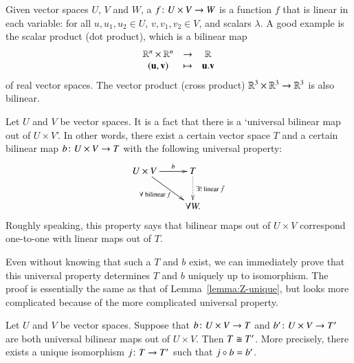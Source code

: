 \begin{iexample} 
\label{eg:univ-tensor}
Given vector%
%
%
spaces $U$, $V$ and $W$, a  $f\from U \times V \to W$ is a function $f$ that is linear in each
variable:
% 
% 
for all $u, u_1, u_2 \in U$, $v, v_1, v_2 \in V$, and scalars $\lambda$.  A
good example is the scalar product (dot product), which is a bilinear map
\[
\begin{array}{ccc}
\mathbb{R}^n \times \mathbb{R}^n        &\to            &\mathbb{R}                 \\
(\mathbf{u}, \mathbf{v})        &\mapsto        &\mathbf{u}.\mathbf{v}
\end{array}
\]
of real vector spaces.  The vector product (cross product) $\mathbb{R}^3 \times
\mathbb{R}^3 \to \mathbb{R}^3$ is also bilinear.  

Let $U$ and $V$ be vector spaces.  It is a fact that there is a `universal
bilinear map out of $U \times V$'.  In other words, there exist a certain
vector space $T$%
%
%
and a certain bilinear map $b\from U \times V \to T$ with the following
universal property:
% 
\begin{equation}        
\label{eq:univ-tensor} 
\begin{array}{c}
\xymatrix{
U \times V \ar[r]^-b \ar[dr]_{\forall \text{ bilinear } f} &
T \ar@{.>}[d]^{\exists! \text{ linear } \bar{f}}     \\
&
\forall W.
}
\end{array}
\end{equation}
% 
Roughly speaking, this property says that bilinear maps out of $U \times V$
correspond one-to-one with linear maps out of $T$.

Even without knowing that such a $T$ and $b$ exist, we can immediately
prove that this universal property determines $T$ and $b$ uniquely up to
isomorphism.  The proof is essentially the same as that of
Lemma~\ref{lemma:Z-unique}, but looks more complicated because of the more
complicated universal property.
\end{iexample}

\begin{ilemma}   
\label{lemma:tensor-unique}
%
%
Let $U$ and $V$ be vector spaces.  Suppose that $b\from U \times V \to T$
and $b'\from U \times V \to T'$ are both universal bilinear maps out of $U
\times V$.  Then $T \cong T'$.  More precisely, there exists a unique
isomorphism $j\from T \to T'$ such that $j \mathbin{\circ} b = b'$.
\end{ilemma}


